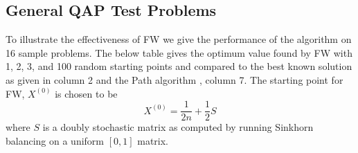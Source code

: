 \documentclass{amsart}
\theoremstyle{plain} \newtheorem{Exa}{Example}[section]
\begin{document}
\subsection{General QAP Test Problems}
To illustrate the effectiveness of FW 
we give the performance of the algorithm on 16 sample problems.  The below table gives the optimum value found by FW with 1, 2, 3, and 100 random starting points   and compared 
to the best known solution as given in column 2 and the Path algorithm  \cite{Path:2009}, column 7.   The starting point for FW, $X^{(0)}$ is chosen to be
$$X^{(0)}=\frac {1}{2n} + \frac{1}{2} S$$
where $S$ is a doubly stochastic matrix as computed by running Sinkhorn balancing on a uniform $[0,1]$ matrix.
\end{document}
